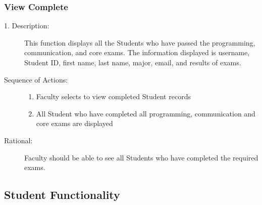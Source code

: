    \subsubsection{\large View Complete}  
   \begin{boxed} %
      \begin{description}
         \item[1. Description:\label{desc:view_complete}]
      This function displays all the Students who have passed the
         programming, communication, and core exams. The information displayed
         is username, Student ID, first name, last name, major, email, and
         results of exams.
         
            \item[Sequence of Actions:]\hspace{10cm}
         \begin{enumerate}
            \item Faculty selects to view completed Student records
            \item All Student who have completed all programming, communication
               and core exams are displayed
      \end{enumerate}

            \item[Rational:]
         Faculty should be able to see all Students who have completed the
         required exams.
      \end{description}
   \end{boxed} %


\subsection{Student Functionality}

